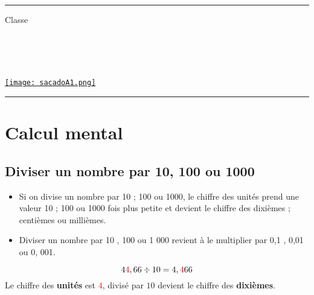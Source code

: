 \documentclass[a4paper,dvipsnames]{article}
\begin{document}

\fancyhead[C]{}
\hrule\medskip %
\begin{minipage}{0.295\textwidth} 
\raggedright
Classe \myClasse \hfill\\
\myDiscipline \hfill\\
\myParcours \hfill\\
\end{minipage}
\begin{minipage}{0.4\textwidth} 
\centering 
\scshape\huge
\textcolor{sacado_purple}{\myTitle} \\ 
\normalsize 
\end{minipage}
\begin{minipage}{0.295\textwidth} 
\raggedleft
\href{https://sacado.xyz/}{\texttt{[image: sacadoA1.png]}}
\end{minipage}
\medskip \hrule
\bigskip


\section{Calcul mental}

\subsection{Diviser un nombre par 10, 100 ou 1000}

\begin{Mt}
\begin{itemize}
\item Si on divise un nombre par 10 ; 100 ou 1000, le chiffre des unités prend une valeur 10 ; 100 ou 1000 fois plus petite et devient le chiffre des dixièmes ; centièmes ou millièmes.
\item Diviser un nombre par 10 , 100 ou 1 000 revient à le multiplier par 0,1 , 0,01 ou 0, 001.
\end{itemize}
\end{Mt}

\begin{Ex}
\[4\textcolor{red}{4},66\div10=4,\textcolor{red}{4}66\]
Le chiffre des \textbf{unités} est \textcolor{red}{$4$}, divisé par $10$ devient le chiffre des \textbf{dixièmes}.
\end{Ex}
\end{document}
